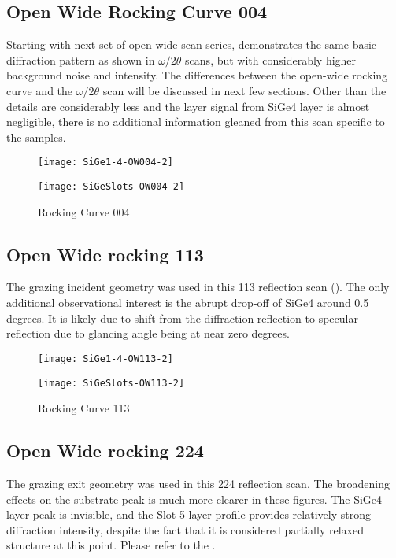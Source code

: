 \subsection{Open Wide Rocking Curve  004}
Starting with next set of open-wide scan series,  demonstrates the same basic diffraction pattern as shown in $\omega/2\theta$ scans, but with considerably higher background noise and intensity. The differences between the open-wide rocking curve and the $\omega/2\theta$ scan will be discussed in next few sections.  Other than the details are considerably less and the layer signal from SiGe4 layer is almost negligible, there is no additional information gleaned from this scan specific to the samples.
\begin{figure}%
\caption{Rocking Curve 004}
\label{OW004}
\begin{minipage}{0.85\linewidth}
\texttt{[image: SiGe1-4-OW004-2]}
\end{minipage}
\begin{minipage}{0.85\linewidth}
\texttt{[image: SiGeSlots-OW004-2]}
\end{minipage}
\end{figure}

\subsection{Open Wide rocking 113}
The grazing incident geometry was used in this 113 reflection scan ().  The only additional observational interest is the abrupt drop-off of SiGe4 around 0.5 degrees.  It is likely due to shift from the diffraction reflection to specular reflection due to glancing angle being at near zero degrees.  

\begin{figure}%
\caption{Rocking Curve 113}
\label{OW113}
\begin{minipage}{0.85\linewidth}
\texttt{[image: SiGe1-4-OW113-2]}
\end{minipage}
\begin{minipage}{0.85\linewidth}
\texttt{[image: SiGeSlots-OW113-2]}
\end{minipage}
\end{figure}


\subsection{Open Wide rocking  224 }
The grazing exit geometry was used in this 224 reflection scan.  The broadening effects on the substrate peak is much more clearer in these figures.  The SiGe4 layer peak is invisible, and the Slot 5 layer profile provides relatively strong diffraction intensity, despite the fact that it is considered partially relaxed structure at this point.  Please refer to the .


